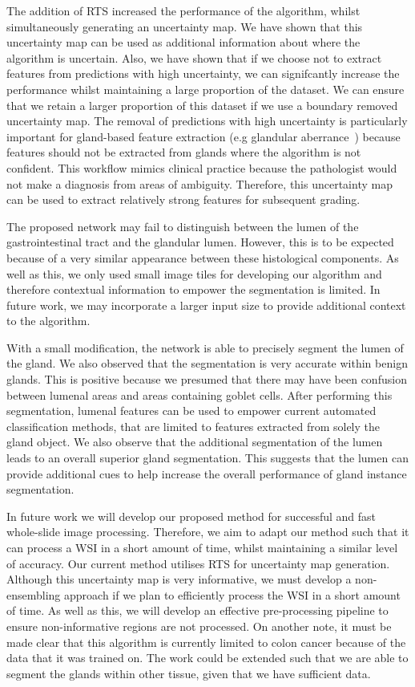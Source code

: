 \documentclass[3p]{elsarticle}
\begin{document}
The addition of RTS increased the performance of the algorithm, whilst simultaneously generating an uncertainty map. We have shown that this uncertainty map can be used as additional information about where the algorithm is uncertain. Also, we have shown that if we choose not to extract features from predictions with high uncertainty, we can signifcantly increase the performance whilst maintaining a large proportion of the dataset. We can ensure that we retain a larger proportion of this dataset if we use a boundary removed uncertainty map. The removal of predictions with high uncertainty is particularly important for gland-based feature extraction (e.g glandular aberrance~\citep{awan2017glandular}) because features should not be extracted from glands where the algorithm is not confident. This workflow mimics clinical practice because the pathologist would not make a diagnosis from areas of ambiguity. Therefore, this uncertainty map can be used to extract relatively strong features for subsequent grading. 

The proposed network may fail to distinguish between the lumen of the gastrointestinal tract and the glandular lumen. However, this is to be expected because of a very similar appearance between these histological components. As well as this, we only used small image tiles for developing our algorithm and therefore contextual information to empower the segmentation is limited. In future work, we may incorporate a larger input size to provide additional context to the algorithm. 

With a small modification, the network is able to precisely segment the lumen of the gland. We also observed that the segmentation is very accurate within benign glands. This is positive because we presumed that there may have been confusion between lumenal areas and areas containing goblet cells. After performing this segmentation, lumenal features can be used to empower current automated classification methods, that are limited to features extracted from solely the gland object. We also observe that the additional segmentation of the lumen leads to an overall superior gland segmentation. This suggests that the lumen can provide additional cues to help increase the overall performance of gland instance segmentation.

In future work we will develop our proposed method for successful and fast whole-slide image processing. Therefore, we aim to adapt our method such that it can process a WSI in a short amount of time, whilst maintaining a similar level of accuracy. Our current method utilises RTS for uncertainty map generation. Although this uncertainty map is very informative, we must develop a non-ensembling approach if we plan to efficiently process the WSI in a short amount of time. As well as this, we will develop an effective pre-processing pipeline to ensure non-informative regions are not processed. On another note, it must be made clear that this algorithm is currently limited to colon cancer because of the data that it was trained on. The work could be extended such that we are able to segment the glands within other tissue, given that we have sufficient data.
\end{document}
